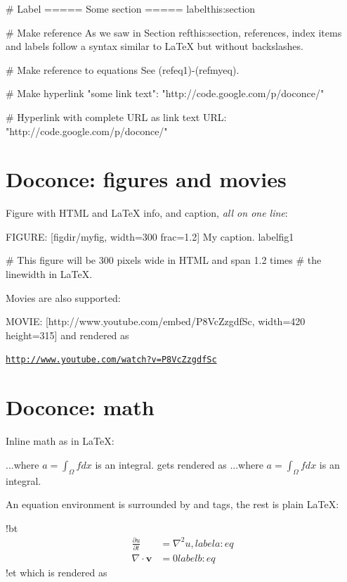 \documentclass[%
oneside,                 %
final,                   %
chapterprefix=true,      %
open=right               %
10pt]{book}
\newenvironment{graybox1admon}[1][]{
\begin{graybox1mdframed}[frametitle=#1]
}
{
\end{graybox1mdframed}
}
\begin{document}
# Label
===== Some section =====
label{this:section}

# Make reference
As we saw in Section ref{this:section}, references, index
items and labels follow a syntax similar to LaTeX
but without backslashes.

# Make reference to equations
See (ref{eq1})-(ref{myeq}).

# Make hyperlink
"some link text": "http://code.google.com/p/doconce/"

# Hyperlink with complete URL as link text
URL: "http://code.google.com/p/doconce/"
\eccq

\section{Doconce: figures and movies}


\begin{graybox1admon}[Notice.]
Figure with HTML and {\LaTeX} info, and caption, \emph{all on one line}:
\end{graybox1admon}

\bccq
FIGURE: [figdir/myfig, width=300 frac=1.2] My caption. label{fig1}

# This figure will be 300 pixels wide in HTML and span 1.2 times
# the linewidth in LaTeX.
\eccq

Movies are also supported:

\bccq
MOVIE: [http://www.youtube.com/embed/P8VcZzgdfSc, width=420 height=315]
\eccq
and rendered as

 \href{{http://www.youtube.com/watch?v=P8VcZzgdfSc}}{\nolinkurl{http://www.youtube.com/watch?v=P8VcZzgdfSc}}

\section{Doconce: math}

Inline math as in {\LaTeX}:

\bccq
...where $a=\int_{\Omega}fdx$ is an integral.
\eccq
gets rendered as ...where $a=\int_{\Omega}fdx$ is an integral.


An equation environment is surrounded by  and  tags,
the rest is plain {\LaTeX}:

\bccq
!bt
\begin{align}
\frac{\partial u}{\partial t} &= \nabla^2 u,
label{a:eq}\\
\nabla\cdot\pmb{v} & = 0
label{b:eq}
\end{align}
!et
\eccq
which is rendered as
\end{document}

